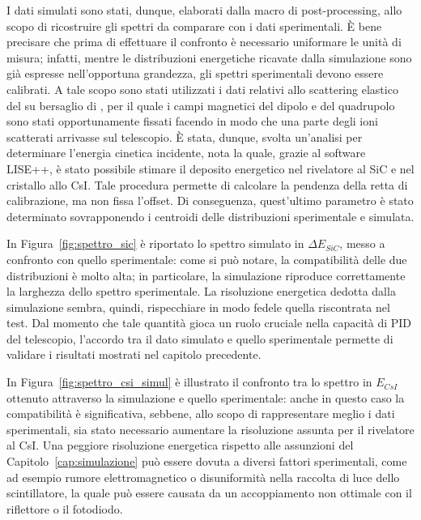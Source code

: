 I dati simulati sono stati, dunque, elaborati dalla macro di post-processing, allo scopo di ricostruire gli spettri  da comparare con i dati sperimentali.
È bene precisare che prima di effettuare il confronto è necessario uniformare le unità di misura; infatti, mentre le distribuzioni energetiche ricavate dalla simulazione sono già espresse nell'opportuna grandezza, gli spettri sperimentali devono essere calibrati.
A tale scopo sono stati utilizzati i dati relativi allo scattering elastico del  su bersaglio di , per il quale i campi magnetici del dipolo e del quadrupolo sono stati opportunamente fissati facendo  in modo che una parte degli ioni scatterati arrivasse sul telescopio.
È stata, dunque, svolta un'analisi per determinare l'energia cinetica incidente, nota la quale, grazie al software LISE++, è stato possibile stimare il deposito energetico nel rivelatore al SiC e nel cristallo allo CsI.
Tale procedura permette di calcolare la pendenza della retta di calibrazione, ma non fissa l'offset.
Di conseguenza, quest'ultimo parametro è stato determinato sovrapponendo i centroidi delle distribuzioni sperimentale e simulata.

In Figura~\ref{fig:spettro_sic} è riportato lo spettro simulato in $\Delta E_{SiC}$, messo a confronto con quello sperimentale: come si può notare, la compatibilità delle due distribuzioni è molto alta; in particolare, la simulazione riproduce correttamente la larghezza dello spettro sperimentale.
La risoluzione energetica dedotta dalla simulazione sembra, quindi, rispecchiare in modo fedele quella riscontrata nel test.
Dal momento che tale quantità gioca un ruolo cruciale nella capacità di PID del telescopio, l'accordo tra il dato simulato e quello sperimentale permette di validare i risultati mostrati nel capitolo precedente.


In Figura~\ref{fig:spettro_csi_simul} è illustrato il confronto tra lo spettro in $E_{CsI}$ ottenuto attraverso la simulazione e quello sperimentale: anche in questo caso la compatibilità è significativa, sebbene, allo scopo di rappresentare meglio i dati sperimentali, sia stato necessario aumentare la risoluzione assunta per il rivelatore al CsI.
Una peggiore risoluzione energetica rispetto alle assunzioni del Capitolo~\ref{cap:simulazione} può essere dovuta a diversi fattori sperimentali, come ad esempio rumore elettromagnetico o disuniformità nella raccolta di luce dello scintillatore, la quale può essere causata da un accoppiamento non ottimale con il riflettore o il fotodiodo.


